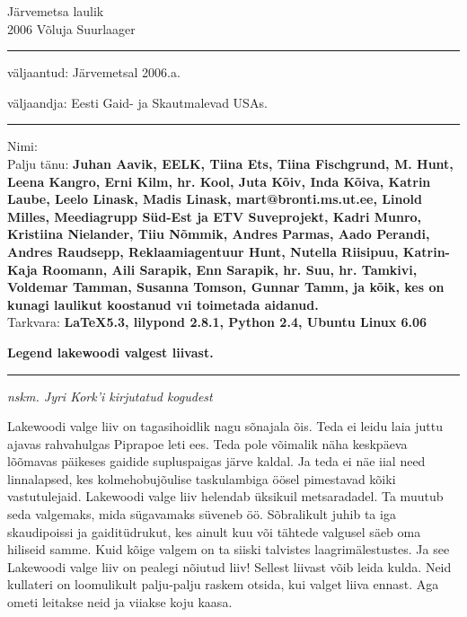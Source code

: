 \documentclass[10pt]{book}
\begin{document}
\rmfamily

\begin{titlepage}
  \null
  \begin{center}
    \vspace{1.5in}
    {\LARGE Järvemetsa laulik }\\
    { 2006 Võluja Suurlaager }
    \vfill
  \end{center}
\end{titlepage}

\null
\vspace{0.5in}
\hrule height 0.05ex
\vspace{.1in}
\centerline{\footnotesize v\"aljaantud: J\"arvemetsal 2006.a.}
\centerline{\footnotesize v\"aljaandja: Eesti Gaid- ja Skautmalevad USAs.    }
\vspace{.1in}
\hrule height 0.05ex
\vspace{.25in}
Nimi:\dotfill
\vfill
{}\\
{\footnotesize Palju t\"anu: \bf{Juhan Aavik, EELK, Tiina Ets, Tiina Fischgrund, M. Hunt, Leena Kangro, Erni Kilm, hr. Kool, Juta K\~oiv, Inda K\~oiva, Katrin Laube, Leelo Linask, Madis Linask, mart@bronti.ms.ut.ee, Linold Milles, Meediagrupp S\"ud-Est ja ETV Suveprojekt, Kadri Munro, Kristiina Nielander, Tiiu N\~ommik, Andres Parmas, Aado Perandi, Andres Raudsepp, Reklaamiagentuur Hunt, Nutella Riisipuu, Katrin-Kaja Roomann, Aili Sarapik, Enn Sarapik, hr. Suu, hr. Tamkivi, Voldemar Tamman, Susanna Tomson, Gunnar Tamm, ja k\~oik, kes on kunagi laulikut koostanud vıi toimetada aidanud. }}\\
{\footnotesize Tarkvara: \bf{\LaTeX 5.3, lilypond 2.8.1, Python 2.4, Ubuntu Linux 6.06}}
\clearpage
\null
\vspace{2in}
\cleardoublepage
{\samepage\raggedbottom
\raggedright
\sloppy
\centerline{ {\bf {\large Legend lakewoodi valgest liivast.}}}
\vspace{0.1in}
\hrule height 0.05ex
\vspace{0.1in}
\centerline{ {\em {\footnotesize nskm. Jyri Kork'i kirjutatud kogudest}}}}
\vspace{.05in}

Lakewoodi valge liiv on tagasihoidlik nagu s\~onajala \~ois.  Teda ei leidu laia juttu ajavas rahvahulgas Piprapoe leti ees.  Teda pole v\~oimalik n\"aha keskp\"aeva l\~o\~omavas p\"aikeses gaidide supluspaigas j\"arve kaldal.  Ja teda ei n\"ae iial need linnalapsed, kes kolmehobuj\~oulise taskulambiga \"o\"osel pimestavad k\~oiki vastutulejaid.  Lakewoodi valge liiv helendab \"uksikuil metsaradadel.  Ta muutub seda valgemaks, mida s\"ugavamaks s\"uveneb \"o\"o.  S\~obralikult juhib ta iga skaudipoissi ja gaidit\"udrukut, kes ainult kuu v\~oi t\"ahtede valgusel s\"aeb oma hiliseid samme.  Kuid k\~oige valgem on ta siiski talvistes laagrim\"alestustes.  Ja see Lakewoodi valge liiv on pealegi n\~oiutud liiv!  Sellest liivast v\~oib leida kulda.  Neid kullateri on loomulikult palju-palju raskem otsida, kui valget liiva ennast.  Aga ometi leitakse neid ja viiakse koju kaasa.
\end{document}
